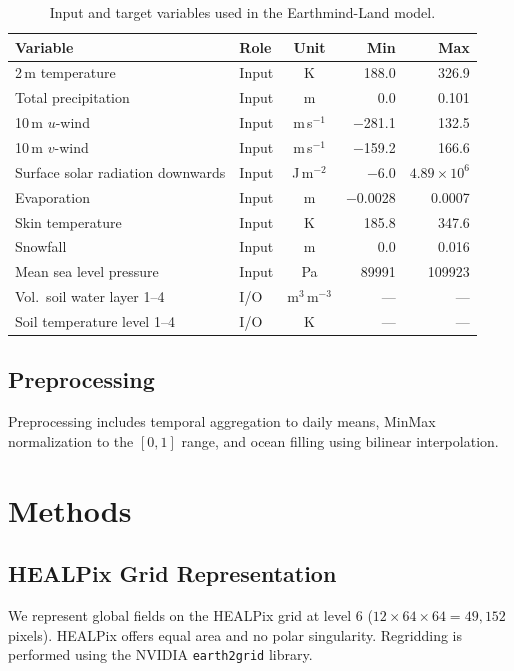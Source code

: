 \documentclass[11pt]{article}
\begin{document}
\begin{table}[htbp]
\centering
\caption{Input and target variables used in the Earthmind-Land model.}
\label{tab:variables}
\small
\begin{tabular}{@{}llcrr@{}}
\toprule
\textbf{Variable} & \textbf{Role} & \textbf{Unit} & \textbf{Min} & \textbf{Max} \\
\midrule
2\,m temperature & Input & K & 188.0 & 326.9 \\
Total precipitation & Input & m & 0.0 & 0.101 \\
10\,m $u$-wind & Input & m\,s$^{-1}$ & $-$281.1 & 132.5 \\
10\,m $v$-wind & Input & m\,s$^{-1}$ & $-$159.2 & 166.6 \\
Surface solar radiation downwards & Input & J\,m$^{-2}$ & $-$6.0 & $4.89\times10^6$ \\
Evaporation & Input & m & $-$0.0028 & 0.0007 \\
Skin temperature & Input & K & 185.8 & 347.6 \\
Snowfall & Input & m & 0.0 & 0.016 \\
Mean sea level pressure & Input & Pa & 89991 & 109923 \\
\midrule
Vol.\ soil water layer 1--4 & I/O & m$^3$\,m$^{-3}$ & --- & --- \\
Soil temperature level 1--4 & I/O & K & --- & --- \\
\bottomrule
\end{tabular}
\end{table}

\subsection{Preprocessing}

Preprocessing includes temporal aggregation to daily means, MinMax normalization to the $[0, 1]$ range, and ocean filling using bilinear interpolation.

\section{Methods}
\label{sec:methods}

\subsection{HEALPix Grid Representation}

We represent global fields on the HEALPix grid at level 6 ($12 \times 64 \times 64 = 49{,}152$ pixels). HEALPix offers equal area and no polar singularity. Regridding is performed using the NVIDIA \texttt{earth2grid} library.
\end{document}

